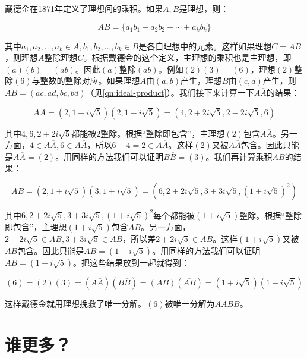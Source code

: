 \documentclass[b5paper]{ctexart}
\begin{document}
戴德金在1871年定义了理想间的乘积。如果$A, B$是理想，则：

\[
AB = \{a_1b_1 + a_2b_2 + \dotsb + a_kb_k\}
\]

其中$a_1, a_2, \dotsc, a_k \in A, b_1, b_2, \dotsc, b_k \in B$是各自理想中的元素。这样如果理想$C = AB$，则理想$A$整除理想$C$。根据戴德金的这个定义，主理想的乘积也是主理想，即$(a)(b) = (ab)$。因此$(a)$整除$(ab)$。例如$(2)(3) = (6)$，理想$(2)$整除$(6)$与整数的整除对应。如果理想$A$由$(a, b)$产生，理想$B$由$(c, d)$产生，则$AB = (ac, ad, bc, bd)$（见\ref{qn:ideal-product}）。我们接下来计算一下$A\overline{A}$的结果：

\[
A\overline{A} = (2, 1 + i\sqrt{5})(2, 1 - i\sqrt{5}) = (4, 2 + 2i\sqrt{5}, 2 - 2i\sqrt{5}, 6)
\]

其中$4, 6, 2 \pm 2i\sqrt{5}$都能被2整除。根据“整除即包含”，主理想$(2)$包含$A\overline{A}$。另一方面，$4 \in A\overline{A}, 6 \in A\overline{A}$，所以$6 - 4 = 2 \in A\overline{A}$。这样$(2)$又被$A\overline{A}$包含。因此只能是$A\overline{A} = (2)$。用同样的方法我们可以证明$B\overline{B} = (3)$。我们再计算乘积$AB$的结果：

\[
AB = (2, 1 + i\sqrt{5})(3, 1 + i\sqrt{5}) = (6, 2 + 2i\sqrt{5}, 3 + 3i\sqrt{5}, (1 + i\sqrt{5})^2)
\]

其中$6, 2 + 2i\sqrt{5}, 3 + 3i\sqrt{5}, (1 + i\sqrt{5})^2$每个都能被$(1 + i\sqrt{5})$整除。根据“整除即包含”，主理想$(1 + i\sqrt{5})$包含$AB$。另一方面，$2 + 2i\sqrt{5} \in AB, 3 + 3i\sqrt{5} \in AB$，所以差$2 + 2i\sqrt{5} \in AB$。这样$(1 + i\sqrt{5})$又被$AB$包含。因此只能是$AB = (1 + i\sqrt{5})$。用同样的方法我们可以证明$\overline{AB} = (1 - i\sqrt{5})$。把这些结果放到一起就得到：

\[
(6) = (2)(3) = (A\overline{A})(B\overline{B}) = (AB)(\overline{AB}) = (1 + i\sqrt{5})(1 - i\sqrt{5})
\]

这样戴德金就用理想挽救了唯一分解。$(6)$被唯一分解为$A\overline{A}B\overline{B}$。

\section{谁更多？}
\end{document}
